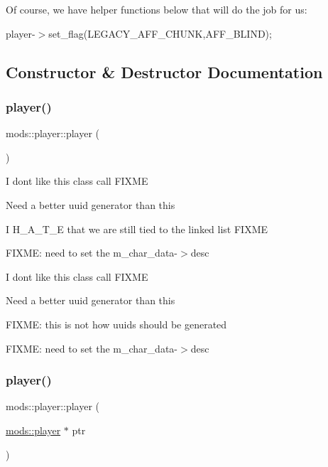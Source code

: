 Of course, we have helper functions below that will do the job for us\+:

player-\/$>$set\+\_\+flag(\+L\+E\+G\+A\+C\+Y\+\_\+\+A\+F\+F\+\_\+\+C\+H\+U\+N\+K,\+A\+F\+F\+\_\+\+B\+L\+I\+N\+D); 

\subsection{Constructor \& Destructor Documentation}
\mbox{\label{classmods_1_1player_ae86efeb0a9121b227ac34b24e0556fed}} 
\subsubsection{\texorpdfstring{player()}{player()}\hspace{0.1cm}{\footnotesize\ttfamily [1/2]}}
{\footnotesize\ttfamily mods\+::player\+::player (\begin{DoxyParamCaption}{ }\end{DoxyParamCaption})}

I don\textquotesingle{}t like this class call F\+I\+X\+ME

Need a better uuid generator than this

I H\+\_\+\+A\+\_\+\+T\+\_\+E that we are still tied to the linked list F\+I\+X\+ME

F\+I\+X\+ME\+: need to set the m\+\_\+char\+\_\+data-\/$>$desc

I don\textquotesingle{}t like this class call F\+I\+X\+ME

Need a better uuid generator than this

F\+I\+X\+ME\+: this is not how uuid\textquotesingle{}s should be generated

F\+I\+X\+ME\+: need to set the m\+\_\+char\+\_\+data-\/$>$desc \mbox{\label{classmods_1_1player_abab6e7c067da6cac1c9e8bd2debbca7a}} 
\subsubsection{\texorpdfstring{player()}{player()}\hspace{0.1cm}{\footnotesize\ttfamily [2/2]}}
{\footnotesize\ttfamily mods\+::player\+::player (\begin{DoxyParamCaption}\item[{\hyperlink{classmods_1_1player}{mods\+::player} $\ast$}]{ptr }\end{DoxyParamCaption})}

